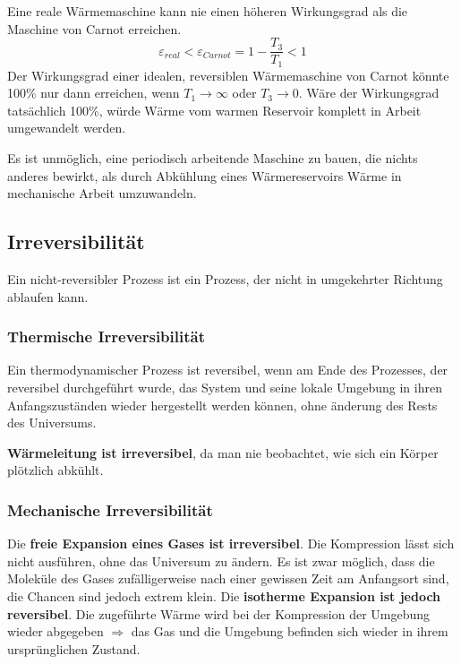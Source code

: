 \documentclass[11pt]{article}
\begin{document}
Eine reale W{\"a}rmemaschine kann nie einen h{\"o}heren Wirkungsgrad als die Maschine von Carnot erreichen.
\begin{equation*}
	\varepsilon_{real} < \varepsilon_{Carnot} = 1 - \frac{T_3}{T_1} < 1
\end{equation*}
Der Wirkungsgrad einer idealen, reversiblen W{\"a}rmemaschine von Carnot k{\"o}nnte 100\% nur dann erreichen, wenn $T_1 \rightarrow \infty$ oder $T_3 \rightarrow 0$. W{\"a}re der Wirkungsgrad tats{\"a}chlich 100\%, w{\"u}rde W{\"a}rme vom warmen Reservoir komplett in Arbeit umgewandelt werden. \newline

Es ist unm{\"o}glich, eine periodisch arbeitende Maschine zu bauen, die nichts anderes bewirkt, als durch Abk{\"u}hlung eines W{\"a}rmereservoirs W{\"a}rme in mechanische Arbeit umzuwandeln. \newline

\subsection{Irreversibilit{\"a}t}

Ein nicht-reversibler Prozess ist ein Prozess, der nicht in umgekehrter Richtung ablaufen kann. \newline

\subsubsection{Thermische Irreversibilit{\"a}t}
Ein thermodynamischer Prozess ist reversibel, wenn am Ende des Prozesses, der reversibel durchgef{\"u}hrt wurde, das System und seine lokale Umgebung in ihren Anfangszust{\"a}nden wieder hergestellt werden k{\"o}nnen, ohne {\"a}nderung des Rests des Universums. \newline

\textbf{W{\"a}rmeleitung ist irreversibel}, da man nie beobachtet, wie sich ein K{\"o}rper pl{\"o}tzlich abk{\"u}hlt.

\subsubsection{Mechanische Irreversibilit{\"a}t}

Die \textbf{freie Expansion eines Gases ist irreversibel}. Die Kompression l{\"a}sst sich nicht ausf{\"u}hren, ohne das Universum zu {\"a}ndern. Es ist zwar m{\"o}glich, dass die Molek{\"u}le des Gases zuf{\"a}lligerweise nach einer gewissen Zeit am Anfangsort sind, die Chancen sind jedoch extrem klein. \newline
Die \textbf{isotherme Expansion ist jedoch reversibel}. Die zugef{\"u}hrte W{\"a}rme wird bei der Kompression der Umgebung wieder abgegeben $\Rightarrow$ das Gas und die Umgebung befinden sich wieder in ihrem urspr{\"u}nglichen Zustand.
\end{document}
